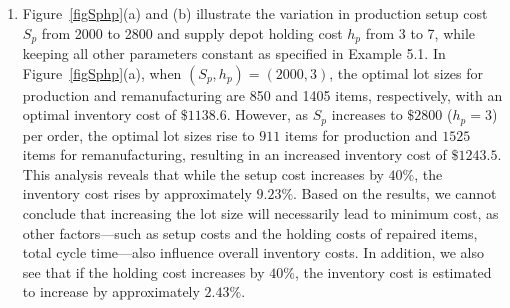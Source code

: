 \documentclass[11pt]{article}
\begin{document}
\begin{enumerate}
\item [(i)] Figure~\ref{figSphp}(a) and (b) illustrate the variation in production setup cost \(S_p\) from 2000 to 2800 and supply depot holding cost \(h_p\) from 3 to 7, while keeping all other parameters constant as specified in Example 5.1. In Figure~\ref{figSphp}(a), when \((S_p, h_p) = (2000, 3)\), the optimal lot sizes for production and remanufacturing are 850 and 1405 items, respectively, with an optimal inventory cost of \(\$1138.6\). However, as \(S_p\) increases to \(\$2800\) (\(h_p=3\)) per order, the optimal lot sizes rise to \(911\) items for production and \(1525\) items for remanufacturing, resulting in an increased inventory cost of \(\$1243.5\). This analysis reveals that while the setup cost increases by $40\%$, the inventory cost rises by approximately $9.23\%$. Based on the results, we cannot conclude that increasing the lot size will necessarily lead to minimum cost, as other factors—such as setup costs and the holding costs of repaired items, total cycle time—also influence overall inventory costs. In addition, we also see that if the holding cost increases by $40\%$, the inventory cost is estimated to increase by approximately $2.43\%$.


\end{enumerate}
\end{document}
